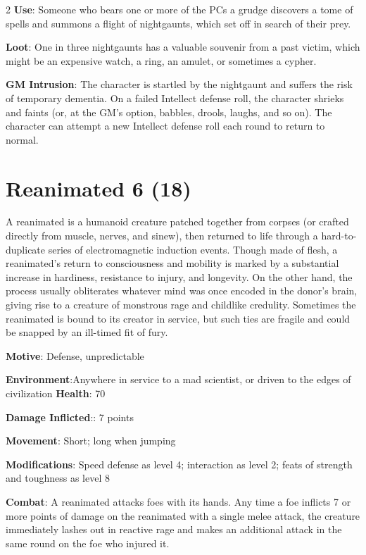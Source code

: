 \begin{multicols}{2}
\textbf{Use}: Someone who bears one or more of the PCs a grudge discovers a tome of spells and summons a flight of nightgaunts, which set off in search of their prey.

\textbf{Loot}: One in three nightgaunts has a valuable souvenir from a past victim, which might be an expensive watch, a ring, an amulet, or sometimes a cypher.

\textbf{GM Intrusion}: The character is startled by the nightgaunt and suffers the risk of temporary dementia. On a failed Intellect defense roll, the character shrieks and faints (or, at the GM’s option, babbles, drools, laughs, and so on). The character can attempt a new Intellect defense roll each round to return to normal.

\section{Reanimated 6 (18)}

A reanimated is a humanoid creature patched together from corpses (or crafted directly from muscle, nerves, and sinew), then returned to life through a hard-to-duplicate series of electromagnetic induction events. Though made of flesh, a reanimated’s return to consciousness and mobility is marked by a substantial increase in hardiness, resistance to injury, and longevity. On the other hand, the process usually obliterates whatever mind was once encoded in the donor’s brain, giving rise to a creature of monstrous rage and childlike credulity. Sometimes the reanimated is bound to its creator in service, but such ties are fragile and could be snapped by an ill-timed fit of fury.

\textbf{Motive}: Defense, unpredictable

\textbf{Environment}:Anywhere in service to a mad scientist, or driven to the edges of civilization \textbf{Health}: 70

\textbf{Damage Inflicted}:: 7 points

\textbf{Movement}: Short; long when jumping

\textbf{Modifications}: Speed defense as level 4; interaction as level 2; feats of strength and toughness as level 8

\textbf{Combat}: A reanimated attacks foes with its hands. Any time a foe inflicts 7 or more points of damage on the reanimated with a single melee attack, the creature immediately lashes out in reactive rage and makes an additional attack in the same round on the foe who injured it.


\end{multicols}
